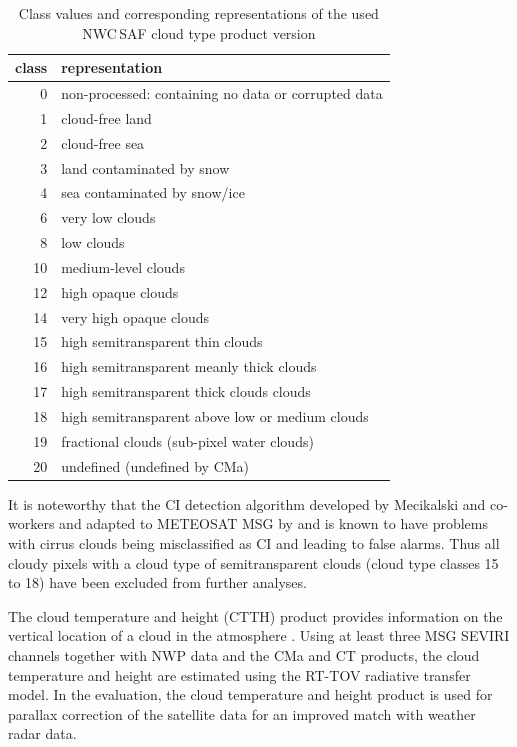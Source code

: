 \begin{table}[htp]
    \centering
    \caption{Class values and corresponding representations of the used NWC\,SAF cloud type product version}
    \begin{tabular}{rl}
         \toprule
         class & representation \\
         \midrule
         0 & non-processed: containing no data or corrupted data\\
         1 & cloud-free land \\
         2 & cloud-free sea \\
         3 & land contaminated by snow \\
         4 & sea contaminated by snow/ice \\
         6 & very low clouds \\
         8 & low clouds \\
         10 & medium-level clouds \\
         12 & high opaque clouds \\
         14 & very high opaque clouds \\
         15 & high semitransparent thin clouds \\
         16 & high semitransparent meanly thick clouds \\
         17 & high semitransparent thick clouds clouds \\
         18 & high semitransparent above low or medium clouds \\
         19 & fractional clouds (sub-pixel water clouds) \\
         20 & undefined (undefined by CMa) \\
         \bottomrule
    \end{tabular}
    \label{tab:CT}
\end{table}

It is noteworthy that the CI detection algorithm developed by Mecikalski and co-workers \citep{ MecikalskiBedka2006, MecikalskiBedkaPaechEtAl2008} and adapted to METEOSAT MSG by \citet{MecikalskiMacKenzieKoenigEtAl2010, MecikalskiMacKenzieKoenigEtAl2010a} and \citet{SiewertKoenigMecikalski2010} is known to have problems with cirrus clouds being misclassified as CI and leading to false alarms. Thus all cloudy pixels with a cloud type of semitransparent clouds (cloud type classes 15 to 18) have been excluded from further analyses.

The cloud temperature and height (CTTH) product provides information on the vertical location of a cloud in the atmosphere \citep{NWCSAFWolken2014}. Using at least three MSG SEVIRI channels together with NWP data and the CMa and CT products, the cloud temperature and height are estimated using the RT-TOV radiative transfer model. In the evaluation, the cloud temperature and height product is used for parallax correction of the satellite data for an improved match with weather radar data.

